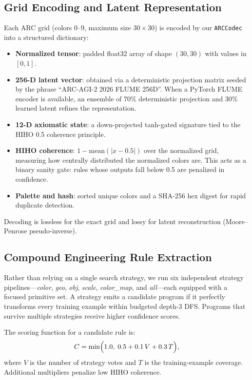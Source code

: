 \documentclass[11pt,a4paper]{article}
\begin{document}
\subsection{Grid Encoding and Latent Representation}
Each ARC grid (colors 0--9, maximum size $30\times30$) is encoded by our \texttt{ARCCodec} into a structured dictionary:
\begin{itemize}
    \item \textbf{Normalized tensor}: padded float32 array of shape $(30,30)$ with values in $[0,1]$.
    \item \textbf{256-D latent vector}: obtained via a deterministic projection matrix seeded by the phrase ``ARC-AGI-2 2026 FLUME 256D''. When a PyTorch FLUME encoder is available, an ensemble of 70\% deterministic projection and 30\% learned latent refines the representation.
    \item \textbf{12-D axiomatic state}: a down-projected tanh-gated signature tied to the HIHO 0.5 coherence principle.
    \item \textbf{HIHO coherence}: $1 - \text{mean}(|x - 0.5|)$ over the normalized grid, measuring how centrally distributed the normalized colors are. This acts as a binary sanity gate: rules whose outputs fall below 0.5 are penalized in confidence.
    \item \textbf{Palette and hash}: sorted unique colors and a SHA-256 hex digest for rapid duplicate detection.
\end{itemize}

Decoding is lossless for the exact grid and lossy for latent reconstruction (Moore--Penrose pseudo-inverse).

\subsection{Compound Engineering Rule Extraction}
Rather than relying on a single search strategy, we run six independent strategy pipelines---\emph{color}, \emph{geo}, \emph{obj}, \emph{scale}, \emph{color\_map}, and \emph{all}---each equipped with a focused primitive set. A strategy emits a candidate program if it perfectly transforms every training example within budgeted depth-3 DFS. Programs that survive multiple strategies receive higher confidence scores.

The scoring function for a candidate rule is:
\begin{equation}
    C = \min\Bigl(1.0,\; 0.5 + 0.1\,V + 0.3\,T\Bigr),
\end{equation}
where $V$ is the number of strategy votes and $T$ is the training-example coverage. Additional multipliers penalize low HIHO coherence.
\end{document}
